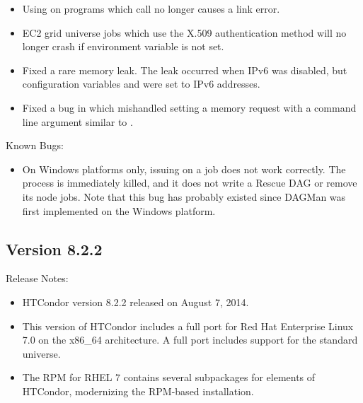 \begin{itemize}

\item Using  on programs which call 
no longer causes a link error.

\item EC2 grid universe jobs which use the X.509 authentication method will
no longer crash if environment variable  is not set.

\item Fixed a rare memory leak. 
The leak occurred when IPv6 was disabled, 
but configuration variables  
and  were set to IPv6 addresses.

\item Fixed a bug in which  mishandled setting a memory request 
with a command line argument similar to .

\end{itemize}

\noindent Known Bugs:

\begin{itemize}

\item On Windows platforms only, issuing  on a 
 job does not work correctly.
The  process is immediately killed,
and it does not write a Rescue DAG or remove its node jobs.
Note that this bug has probably existed since DAGMan was first
implemented on the Windows platform.

\end{itemize}

\subsection*{\label{sec:New-8-2-2}Version 8.2.2}

\noindent Release Notes:

\begin{itemize}

\item HTCondor version 8.2.2 released on August 7, 2014.

\item This version of HTCondor includes a full port for 
Red Hat Enterprise Linux 7.0 on the x86\_64 architecture.
A full port includes support for the standard universe.

\item The RPM for RHEL 7 contains several subpackages for elements of HTCondor,
modernizing the RPM-based installation.

\end{itemize}

